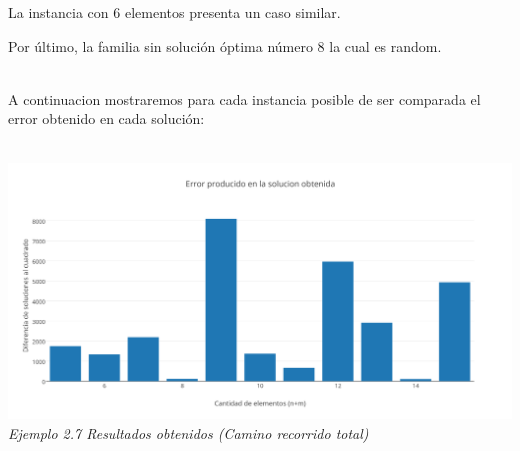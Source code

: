 La instancia con 6 elementos presenta un caso similar.
  
Por \'ultimo, la familia sin soluci\'on \'optima n\'umero 8 la cual es random.\\\\


\begin{figure} [!ht]
 \centering
       \label{fig:jaggies}
    \label{fig:moire}
    \end{figure}

A continuacion mostraremos para cada instancia posible de ser comparada el error obtenido en cada soluci\'on: \\\\

\vspace*{0.3cm} \vspace*{0.3cm}
  \begin{center}
\includegraphics[scale=0.40]{./EJ2/randomdif.png}
\\{\textit{Ejemplo 2.7 Resultados obtenidos (Camino recorrido total) }}
  \end{center}
  \vspace*{0.3cm}
  

